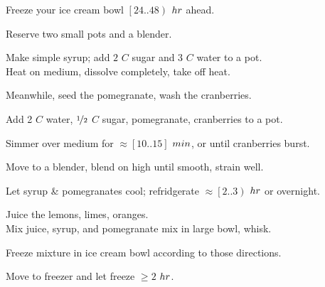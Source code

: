 \begin{preparation}
\item Freeze your ice cream bowl $\left[24 .. 48\right)$ $\hour$ ahead.
\item Reserve two small pots and a blender.
\item Make simple syrup; add $2$ $C$ sugar and 3 $C$ water to a pot.\\
	Heat on medium, dissolve completely, take off heat.
\item Meanwhile, seed the pomegranate, wash the cranberries.
\item Add 2 $C$ water, $\onehalf$ $C$ sugar, pomegranate, cranberries to a pot.
\item Simmer over medium for $\approx [10..15]$ $\minute$, or until cranberries burst.
\item Move to a blender, blend on high until smooth, strain well.
\item Let syrup \& pomegranates cool; refridgerate $\approx \left[2..3\right)$ $\hour$ or overnight.
\item Juice the lemons, limes, oranges.\\
	Mix juice, syrup, and pomegranate mix in large bowl, whisk.
\item Freeze mixture in ice cream bowl according to those directions.
\item Move to freezer and let freeze $\ge2$ $\hour$.
\end{preparation}


\recipeend%
